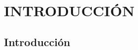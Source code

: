 \documentclass[reqno,12pt,oneside]{report}
\theoremstyle{plain}
\theoremstyle{definition}
\theoremstyle{remark}
\numberwithin{theorem}{chapter}     %
\begin{document}
\startthechapters

\part{INTRODUCCIÓN}
\label{part1}

\acresetall
\chapter{Introducción}
\label{cap1}



%

%


%

%
\end{document}
